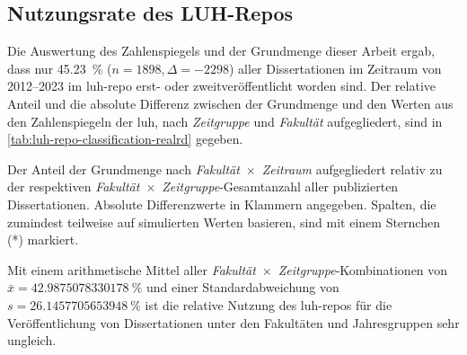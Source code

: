 \subsection{Nutzungsrate des LUH-Repos}\label{sec:luh-repo-results-zahlenspiegel}
Die Auswertung des Zahlenspiegels und der Grundmenge dieser Arbeit ergab, dass nur \SI[round-mode=places,round-precision=2]{45,23}{\percent} ($n=\num{1898},\Delta=\num{-2298}$) aller Dissertationen im Zeitraum von 2012--2023 im \gls{luh-repo} erst- oder zweitveröffentlicht worden sind.
Der relative Anteil und die absolute Differenz zwischen der Grundmenge und den Werten aus den Zahlenspiegeln der \gls{luh}, nach \textit{Zeitgruppe} und \textit{Fakultät} aufgegliedert, sind in \cref{tab:luh-repo-classification-realrd} gegeben.
\begin{table}[!htbp]
	\caption{Der Anteil der Grundmenge nach \textit{Fakultät}~$\times$~\textit{Zeitraum} aufgegliedert relativ zu der respektiven \textit{Fakultät}~$\times$~\textit{Zeitgruppe}-Gesamtanzahl aller publizierten Dissertationen.
    Absolute Differenzwerte in Klammern angegeben.
    Spalten, die zumindest teilweise auf simulierten Werten basieren, sind mit einem Sternchen (*) markiert.}
    
    \label{tab:luh-repo-zahlenspiegel-relative-grundmenge}
\end{table}

\noindent Mit einem arithmetische Mittel aller \textit{Fakultät}~$\times$~\textit{Zeitgruppe}-Kombinationen von $\bar{x}=\SI[round-mode=places,round-precision=2]{42.9875078330178}{\percent}$ und einer Standardabweichung von $s=\SI[round-mode=places,round-precision=2]{26.1457705653948}{\percent}$ ist die relative Nutzung des \gls{luh-repo}s für die Veröffentlichung von Dissertationen unter den Fakultäten und Jahresgruppen sehr ungleich.

